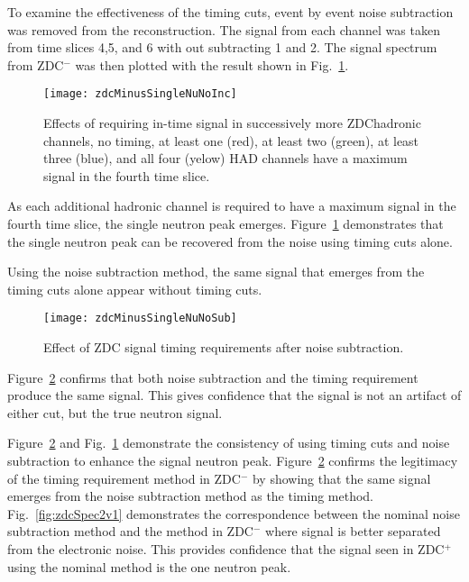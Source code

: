       To examine the effectiveness of the timing cuts, event by event noise 
        subtraction was removed from the \DIFdelbegin {}\DIFdelend \DIFaddbegin {}\DIFaddend reconstruction.
      The signal from each channel was taken from time slices 4,5, and 6 with
        out subtracting 1 and 2.
      The signal spectrum from ZDC$^{-}$ was then plotted with the result
        shown in Fig.~\ref{fig:zdcTimingCuts}.
      \begin{figure}[!Hhbt]
        \centering
        \texttt{[image: zdcMinusSingleNuNoInc]}
        \caption{Effects of requiring in-time signal in successively more 
          ZDC\DIFaddbeginFL \DIFaddFL{$^{-}$ }\DIFaddendFL hadronic channels, no timing, at least one (red), at least two (green),
            at least three (blue), and all four (yelow) HAD channels have a maximum signal
            in the fourth time slice.}
        \label{fig:zdcTimingCuts}
      \end{figure}
      As each additional hadronic channel is required to have a maximum signal
        in the fourth time slice, the single neutron peak emerges. 
      Figure~\ref{fig:zdcTimingCuts} demonstrates that the single neutron peak 
        can be recovered from the noise using timing cuts alone. 

      Using the \DIFdelbegin {}\DIFdelend \DIFaddbegin {}\DIFaddend noise subtraction method, the same signal that emerges
        from the timing cuts alone appear without timing cuts.
       \begin{figure}[h]
        \centering
        \texttt{[image: zdcMinusSingleNuNoSub]}
        \caption{Effect of ZDC signal timing requirements after noise 
          subtraction.}
        \label{fig:zdcTimingAfterNoiseSub}
      \end{figure}
      Figure~\ref{fig:zdcTimingAfterNoiseSub} confirms that both noise 
        subtraction and the timing requirement produce the same signal.
      This gives confidence that the signal is not an artifact of either cut, 
        but the true neutron signal.

      Figure~\ref{fig:zdcTimingAfterNoiseSub} and Fig.~\ref{fig:zdcTimingCuts} 
        demonstrate the consistency of using timing cuts and noise 
        subtraction to enhance the signal neutron peak. 
      Figure~\ref{fig:zdcTimingAfterNoiseSub} confirms the legitimacy of the 
        timing requirement method in ZDC$^{-}$ by showing that the same
        signal emerges from the noise subtraction method as the timing method.
      Fig.~\ref{fig:zdcSpec2v1} demonstrates the correspondence between
        the nominal noise subtraction method and the \DIFdelbegin {}\DIFdelend \DIFaddbegin {}\DIFaddend method in 
        ZDC$^{-}$ where \DIFaddbegin {}\DIFaddend signal is better separated from the electronic noise. 
      This provides confidence that the signal seen in ZDC$^{+}$ using 
        the nominal method is the one neutron peak.
